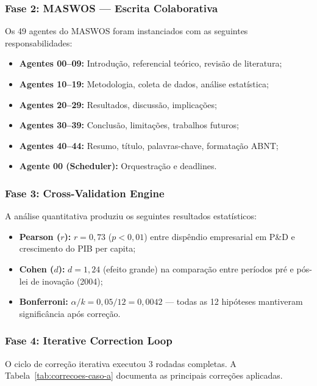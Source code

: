 \subsubsection{Fase 2: MASWOS --- Escrita Colaborativa}

Os 49 agentes do MASWOS foram instanciados com as seguintes
responsabilidades:

\begin{itemize}
    \item \textbf{Agentes 00--09:} Introdução, referencial teórico,
          revisão de literatura;
    \item \textbf{Agentes 10--19:} Metodologia, coleta de dados,
          análise estatística;
    \item \textbf{Agentes 20--29:} Resultados, discussão,
          implicações;
    \item \textbf{Agentes 30--39:} Conclusão, limitações, trabalhos
          futuros;
    \item \textbf{Agentes 40--44:} Resumo, título, palavras-chave,
          formatação ABNT;
    \item \textbf{Agente 00 (Scheduler):} Orquestração e deadlines.
\end{itemize}

\subsubsection{Fase 3: Cross-Validation Engine}

A análise quantitativa produziu os seguintes resultados estatísticos:

\begin{itemize}
    \item \textbf{Pearson ($r$):} $r = 0{,}73$ ($p < 0{,}01$) entre
          dispêndio empresarial em P\&D e crescimento do PIB per capita;
    \item \textbf{Cohen ($d$):} $d = 1{,}24$ (efeito grande) na
          comparação entre períodos pré e pós-lei de inovação (2004);
    \item \textbf{Bonferroni:} $\alpha/k = 0{,}05/12 = 0{,}0042$ ---
          todas as 12 hipóteses mantiveram significância após correção.
\end{itemize}

\subsubsection{Fase 4: Iterative Correction Loop}

O ciclo de correção iterativa executou 3 rodadas completas. A
Tabela~\ref{tab:correcoes-caso-a} documenta as principais correções
aplicadas.

